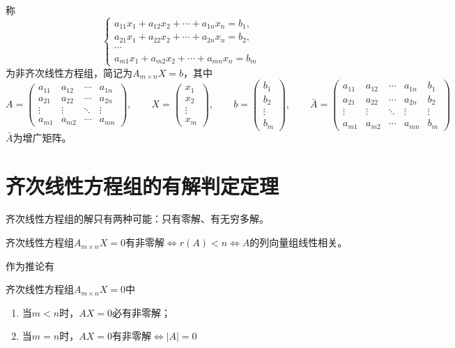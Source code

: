 称
\[
    \begin{cases}
        a_{11}x_1 + a_{12}x_2 + \cdots + a_{1n}x_n = b_1, \\
        a_{21}x_1 + a_{22}x_2 + \cdots + a_{2n}x_n = b_2, \\
        \cdots                                            \\
        a_{m1}x_1 + a_{m2}x_2 + \cdots + a_{mn}x_n = b_m
    \end{cases}
\]
为非齐次线性方程组，简记为$A_{m\times n}X=b$，其中
\[
    A =
    \begin{pmatrix}
        a_{11} & a_{12} & \cdots & a_{1n} \\
        a_{21} & a_{22} & \cdots & a_{2n} \\
        \vdots & \vdots & \ddots & \vdots \\
        a_{m1} & a_{m2} & \cdots & a_{mn}
    \end{pmatrix},
    \qquad
    X=
    \begin{pmatrix}
        x_1 \\x_2\\\vdots\\x_m
    \end{pmatrix},
    \qquad
    b=
    \begin{pmatrix}
        b_1 \\b_2\\\vdots\\b_m
    \end{pmatrix},
    \qquad
    \bar{A}=
    \left(\begin{array}{cccc|c}
            a_{11} & a_{12} & \cdots & a_{1n} & b_1    \\
            a_{21} & a_{22} & \cdots & a_{2n} & b_2    \\
            \vdots & \vdots & \ddots & \vdots & \vdots \\
            a_{m1} & a_{m2} & \cdots & a_{mn} & b_m
        \end{array}\right)
\]
$\bar{A}$为增广矩阵。

\section{齐次线性方程组的有解判定定理}
齐次线性方程组的解只有两种可能：只有零解、有无穷多解。
\begin{theorem}
    齐次线性方程组$A_{m\times n}X=0$有非零解$\iff r(A)<n \iff A$的列向量组线性相关。
\end{theorem}
作为推论有
\begin{theorem}
    齐次线性方程组$A_{m\times n}X=0$中
    \begin{enumerate}[(1)]
        \item 当$m<n$时，$AX=0$必有非零解；
        \item 当$m=n$时，$AX=0$有非零解$\iff |A|=0$
    \end{enumerate}
\end{theorem}

